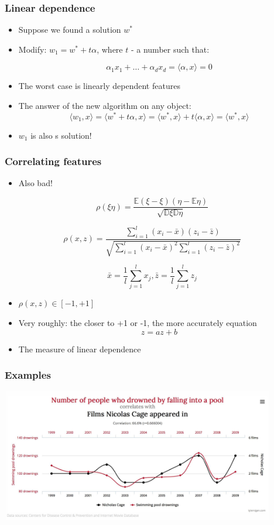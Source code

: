 \documentclass[default]{beamer}
\begin{document}
	\begin{frame}	
		\frametitle{Linear dependence}
		
		\Large
		\begin{itemize}
			\item Suppose we found a solution $w^*$
			\item Modify: $w_1=w^*+t\alpha$, where $t$ - a number such that:
			
			\[
				\alpha_1x_1+\dots+\alpha_dx_d=\langle \alpha,x\rangle=0
			\]
			\item The worst case is linearly dependent features
			\item The answer of the new algorithm on any object:
			\[
				\langle w_1, x\rangle = \langle w^*+t\alpha,x\rangle=\langle w^*,x\rangle+t\langle \alpha,x\rangle=\langle w^*,x\rangle
			\]
			\item $w_1$ is also s solution!
		\end{itemize}
		
	\end{frame}

	\begin{frame}	
		\frametitle{Correlating features}
		
		\begin{itemize}
			\item Also bad!
		\end{itemize}
		\[
			\rho(\xi \eta)=\frac{\mathbb E(\xi-\mathbb{\xi})(\eta-\mathbb E \eta)}{\sqrt{\mathbb D\xi\mathbb D\eta}}
		\]
		
		\[
			\rho(x, z)=\frac{\sum_{i=1}^l(x_i-\bar x)(z_i-\bar z)}{\sqrt{\sum_{i=1}^l(x_i-\bar x)^2\sum_{i=1}^l(z_i-\bar z)^2}}
		\]
		
		\[
			\bar x = \frac{1}{l}\sum_{j=1}^lx_j, \bar z = \frac{1}{l}\sum_{j=1}^lz_j
		\]
		\begin{itemize}
			\item $\rho(x,z)\in [-1,+1]$
			\item Very roughly: the closer to +1 or -1, the more accurately equation
			\[
				z=az+b
			\]
			\item The measure of linear dependence
		\end{itemize}
	\end{frame}

	\begin{frame}	
		\frametitle{Examples}
		
		\centering
		\includegraphics[width=0.9\textwidth]{linear_34.jpg}
	\end{frame}
\end{document}
